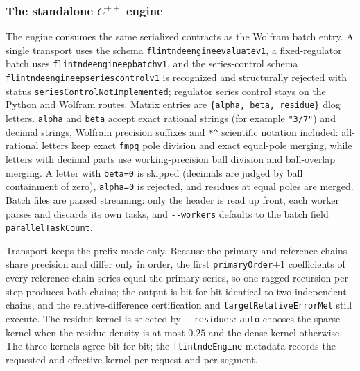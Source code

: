 \documentclass[11pt]{article}
\renewcommand{\_}{\origunderscore\allowbreak}
\begin{document}
\subsubsection{The standalone \texorpdfstring{$C^{++}$}{C++} engine}
\label{subsec:engine}

The engine consumes the same serialized contracts as the Wolfram batch entry.  A single
transport uses the schema \texttt{flintnde\_engine\_evaluate\_v1}, a fixed-regulator batch
uses \texttt{flintnde\_engine\_ep\_batch\_v1}, and the series-control schema
\texttt{flintnde\_engine\_ep\_series\_control\_v1} is recognized and structurally rejected
with status \texttt{seriesControlNotImplemented}; regulator series control stays on the
Python and Wolfram routes.  Matrix entries are \texttt{\{alpha, beta, residue\}} dlog letters.
\texttt{alpha} and \texttt{beta} accept exact rational strings (for example \texttt{"3/7"})
and decimal strings, Wolfram precision suffixes and \texttt{*\textasciicircum} scientific notation
included: all-rational letters keep exact \texttt{fmpq} pole division and exact equal-pole
merging, while letters with decimal parts use working-precision ball division and
ball-overlap merging.  A letter with \texttt{beta=0} is skipped (decimals are judged by ball
containment of zero), \texttt{alpha=0} is rejected, and
residues at equal poles are merged.  Batch files are parsed streaming: only the header is
read up front, each worker parses and discards its own tasks, and \texttt{-{}-workers}
defaults to the batch field \texttt{parallelTaskCount}.

Transport keeps the prefix mode only.  Because the primary and reference chains share
precision and differ only in order, the first \texttt{primaryOrder}$+1$ coefficients of every
reference-chain series equal the primary series, so one ragged recursion per step produces
both chains; the output is bit-for-bit identical to two independent chains, and the
relative-difference certification and \texttt{targetRelativeErrorMet} still execute.  The
residue kernel is selected by \texttt{-{}-residues}: \texttt{auto} chooses the sparse kernel
when the residue density is at most $0.25$ and the dense kernel otherwise.  The three
kernels agree bit for bit; the \texttt{flintndeEngine} metadata records the requested and
effective kernel per request and per segment.
\end{document}
